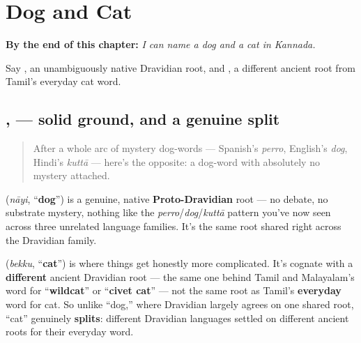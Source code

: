 
\chapter{Dog and Cat}
\label{ch:ka-dog-and-cat}

\begin{chapteropening}
\textbf{By the end of this chapter:} \emph{I can name a dog and a cat in Kannada.}

Say , an unambiguously native Dravidian root, and , a different ancient root from Tamil's everyday cat word.
\end{chapteropening}

\section[\texorpdfstring{\kn{ನಾಯಿ}, \kn{ಬೆಕ್ಕು} (nāyi, bekku)}{ನಾಯಿ, ಬೆಕ್ಕು (nāyi, bekku)}]{,  — solid ground, and a genuine split}

\label{lesson:KA-C21-naayi-bekku}



\begin{quote}
After a whole arc of mystery dog-words — Spanish's \emph{perro}, English's \emph{dog}, Hindi's \emph{kuttā} — here's the opposite: a dog-word with absolutely no mystery attached.
\end{quote}

\begin{cousinweb}
\textbf{} (\emph{nāyi}, \textquotedblleft{}\textbf{dog}\textquotedblright{}) is a genuine, native \textbf{Proto-Dravidian} root — no debate, no substrate mystery, nothing like the \emph{perro}/\emph{dog}/\emph{kuttā} pattern you've now seen across three unrelated language families. It's the same root shared right across the Dravidian family.
\end{cousinweb}

\begin{cousinweb}
\textbf{} (\emph{bekku}, \textquotedblleft{}\textbf{cat}\textquotedblright{}) is where things get honestly more complicated. It's cognate with a \textbf{different} ancient Dravidian root — the same one behind Tamil and Malayalam's word for \textquotedblleft{}\textbf{wildcat}\textquotedblright{} or \textquotedblleft{}\textbf{civet cat}\textquotedblright{} — not the same root as Tamil's \textbf{everyday} word for cat. So unlike \textquotedblleft{}dog,\textquotedblright{} where Dravidian largely agrees on one shared root, \textquotedblleft{}cat\textquotedblright{} genuinely \textbf{splits}: different Dravidian languages settled on different ancient roots for their everyday word.
\end{cousinweb}

